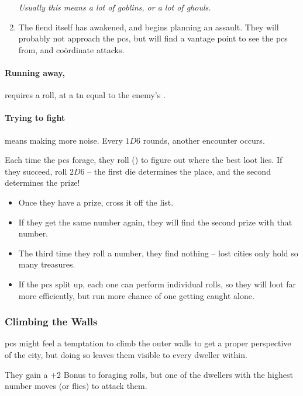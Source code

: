 \begin{multicols}{2}
\begin{enumerate}
  \textit{Usually this means a lot of goblins, or a lot of ghouls.}
  \item
  The fiend itself has awakened, and begins planning an assault.
  They will probably not approach the \glspl{pc}, but will find a vantage point to see the \glspl{pc} from, and co\"ordinate attacks.
\end{enumerate}

\paragraph{Running away,}
requires a  roll, at a \gls{tn} equal to the enemy's .

\paragraph{Trying to fight}
means making more noise.
Every $1D6$ rounds, another encounter occurs.

\label{lostForaging}

Each time the \glspl{pc} forage, they roll  (\tn[12]) to figure out where the best loot lies.
If they succeed, roll $2D6$ -- the first die determines the place, and the second determines the prize!

\begin{itemize}
  \item
  Once they have a prize, cross it off the list.
  \item
  If they get the same number again, they will find the second prize with that number.
  \item
  The third time they roll a number, they find nothing -- lost cities only hold so many treasures.
  \item
  If the \glspl{pc} split up, each one can perform individual rolls, so they will loot far more efficiently, but run more chance of one getting caught alone.

\end{itemize}

\subsubsection{Climbing the Walls}

\Glspl{pc} might feel a temptation to climb the outer walls to get a proper perspective of the city, but doing so leaves them visible to every dweller within.

They gain a +2 Bonus to foraging rolls, but one of the dwellers with the highest number moves (or flies) to attack them.

\end{multicols}

